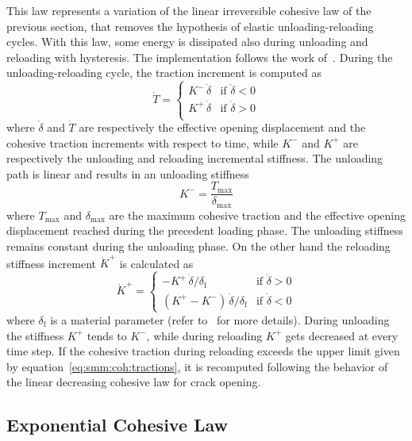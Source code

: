 This law represents a variation of the linear irreversible cohesive
law of the previous section, that removes the hypothesis of elastic
unloading-reloading cycles. With this law, some energy is dissipated
also during unloading and reloading with hysteresis. The
implementation follows the work of~\cite{nguyen2001}. During the
unloading-reloading cycle, the traction increment is computed as
\begin{equation}
  \dot{T} =
  \begin{cases}
    K^- \, \dot{\delta} & \text{if $\dot{\delta} < 0$} \\
    K^+ \, \dot{\delta} & \text{if $\dot{\delta} > 0$} \\
  \end{cases}
\end{equation}
where $\dot{\delta}$ and $\dot{T}$ are respectively the effective
opening displacement and the cohesive traction increments with respect
to time, while $K^-$ and $K^+$ are respectively the unloading and
reloading incremental stiffness. The unloading path is linear and
results in an unloading stiffness
\begin{equation}
  K^- = \frac{T_\mathrm{max}}{\delta_\mathrm{max}}
\end{equation}
where $T_\mathrm{max}$ and $\delta_\mathrm{max}$ are the maximum
cohesive traction and the effective opening displacement reached
during the precedent loading phase. The unloading stiffness remains
constant during the unloading phase. On the other hand the reloading
stiffness increment $\dot{K}^+$ is calculated as
\begin{equation}
  \dot{K}^+ =
  \begin{cases}
    - K^+ \, \dot{\delta} / \delta_\mathrm{f} & \text{if $\dot{\delta}
      > 0$} \\
    \left( K^+ - K^- \right) \, \dot{\delta} / \delta_\mathrm{f} &
    \text{if $\dot{\delta} < 0$}
  \end{cases}
\end{equation}
where $\delta_\mathrm{f}$ is a material parameter (refer
to~\cite{vocialta15} for more details). During unloading the stiffness
$K^+$ tends to $K^-$, while during reloading $K^+$ gets decreased at
every time step. If the cohesive traction during reloading exceeds the
upper limit given by equation~\eqref{eq:smm:coh:tractions}, it is
recomputed following the behavior of the linear decreasing cohesive
law for crack opening.

\subsection{Exponential Cohesive Law}

